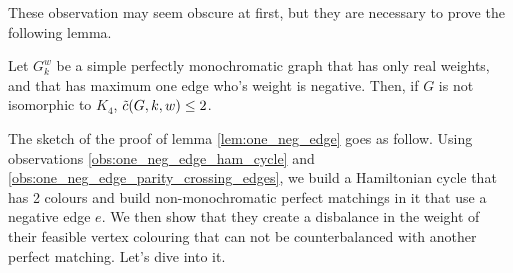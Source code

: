 These observation may seem obscure at first, but they are necessary to prove the following lemma.

\begin{lemma}
    \label{lem:one_neg_edge}
    Let $G_k^w$ be a simple perfectly monochromatic graph that has only real weights, and that has maximum one edge who's weight is negative. Then, if $G$ is not isomorphic to $K_4$, $\Tilde{c}(G, k, w) \leq 2$.
\end{lemma}

The sketch of the proof of lemma \ref{lem:one_neg_edge} goes as follow. Using observations \ref{obs:one_neg_edge_ham_cycle} and \ref{obs:one_neg_edge_parity_crossing_edges}, we build a Hamiltonian cycle that has 2 colours and build non-monochromatic perfect matchings in it that use a negative edge $e$. We then show that they create a disbalance in the weight of their feasible vertex colouring that can not be counterbalanced with another perfect matching. Let's dive into it.

